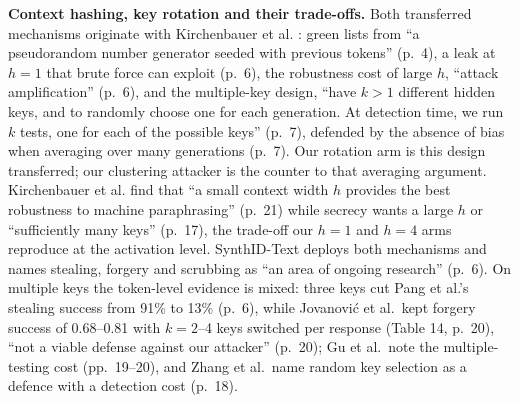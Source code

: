 \documentclass[11pt,letterpaper]{article}
\begin{document}
\textbf{Context hashing, key rotation and their trade-offs.} Both transferred mechanisms originate with Kirchenbauer et al. \citep{kirchenbauer2023watermark}: green lists from ``a pseudorandom number generator seeded with previous tokens'' (p.~4), a leak at \(h = 1\) that brute force can exploit (p.~6), the robustness cost of large \(h\), ``attack amplification'' (p.~6), and the multiple-key design, ``have \(k > 1\) different hidden keys, and to randomly choose one for each generation. At detection time, we run \(k\) tests, one for each of the possible keys'' (p.~7), defended by the absence of bias when averaging over many generations (p.~7). Our rotation arm is this design transferred; our clustering attacker is the counter to that averaging argument. Kirchenbauer et al. \citep{kirchenbauer2024reliability} find that ``a small context width \(h\) provides the best robustness to machine paraphrasing'' (p.~21) while secrecy wants a large \(h\) or ``sufficiently many keys'' (p.~17), the trade-off our \(h = 1\) and \(h = 4\) arms reproduce at the activation level. SynthID-Text deploys both mechanisms \citep{dathathri2024synthid, huggingface2026synthidconfig} and names stealing, forgery and scrubbing as ``an area of ongoing research'' (p.~6). On multiple keys the token-level evidence is mixed: three keys cut Pang et al.'s stealing success from 91\% to 13\% (p.~6), while Jovanovi\'c et al.~kept forgery success of 0.68--0.81 with \(k = 2\)--4 keys switched per response (Table 14, p.~20), ``not a viable defense against our attacker'' (p.~20); Gu et al.~note the multiple-testing cost (pp.~19--20), and Zhang et al.~name random key selection as a defence with a detection cost (p.~18).
\end{document}
